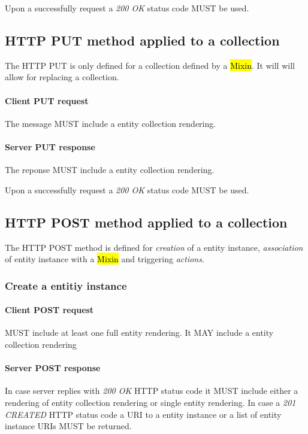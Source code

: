 \documentclass[10pt,a4paper]{article}
\begin{document}
Upon a successfully request a \emph{200 OK} status code MUST be used.

\subsection{HTTP PUT method applied to a collection}
The HTTP PUT is only defined for a collection defined by a \hl{Mixin}. It will will allow for replacing a collection.

\paragraph{Client PUT request}
The message MUST include a entity collection rendering.

\paragraph{Server PUT response}
The reponse MUST include a entity collection rendering.

Upon a successfully request a \emph{200 OK} status code MUST be used.

\subsection{HTTP POST method applied to a collection}
The HTTP POST method is defined for {\em creation} of a entity instance, {\em association} of entity instance with a \hl{Mixin} and triggering {\em actions}.

\subsubsection{Create a entitiy instance}

\paragraph{Client POST request}
MUST include at least one full entity rendering. It MAY include a entity collection rendering

\paragraph{Server POST response}
In case server replies with \emph{200 OK} HTTP status code it MUST include either a rendering of entity collection rendering or single entity rendering. In case a \emph{201 CREATED} HTTP status code a URI to a entity instance or a list of entity instance URIs MUST be returned.
\end{document}
